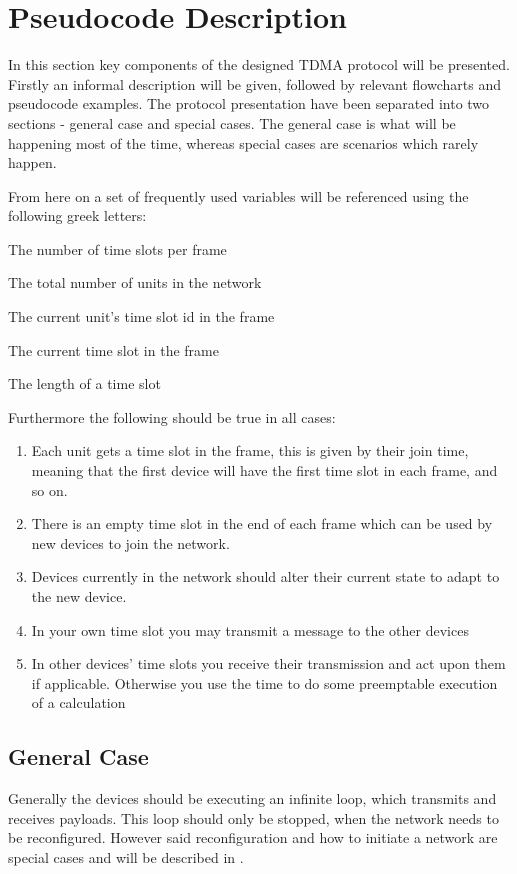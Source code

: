 \section{Pseudocode Description}
In this section key components of the designed TDMA protocol will be presented.
Firstly an informal description will be given, followed by relevant flowcharts and pseudocode examples.
The protocol presentation have been separated into two sections - general case and special cases. 
The general case is what will be happening most of the time, whereas special cases are scenarios which rarely happen. 

From here on a set of frequently used variables will be referenced using the following greek letters: 
\begin{description}[labelindent=\parindent]
    \item[$\alpha$] The number of time slots per frame
    \item[$\beta$] The total number of units in the network
    \item[$\kappa$] The current unit's time slot id in the frame
    \item[$\lambda$] The current time slot in the frame
    \item[$\rho$] The length of a time slot
\end{description}  
\noindent
Furthermore the following should be true in all cases: 
\begin{enumerate}[label=\itshape \alph*\upshape)]
    \item Each unit gets a time slot in the frame, this is given by their join time, meaning that the first device will have the first time slot in each frame, and so on.
    \item There is an empty time slot in the end of each frame which can be used by new devices to join the network.
    \item Devices currently in the network should alter their current state to adapt to the new device.
    \item In your own time slot you may transmit a message to the other devices
    \item In other devices' time slots you receive their transmission and act upon them if applicable. Otherwise you use the time to do some preemptable execution of a calculation
\end{enumerate}
                    
\subsection{General Case} %
\label{sub:general_case}
Generally the devices should be executing an infinite loop, which transmits and receives payloads.
This loop should only be stopped, when the network needs to be reconfigured.
However said reconfiguration and how to initiate a network are special cases and will be described in .
 
